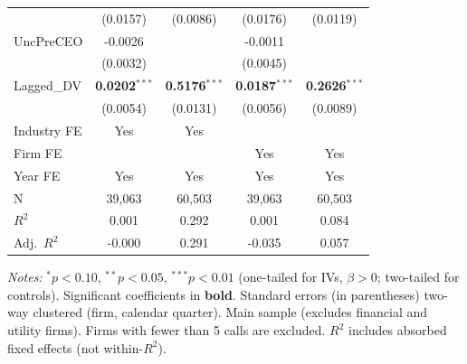\documentclass[11pt,a4paper]{article}
\begin{document}
\begin{table}[htbp]
\begin{tabular}{lcccc}
 & (0.0157) & (0.0086) & (0.0176) & (0.0119) \\
UncPreCEO & -0.0026 &  & -0.0011 &  \\
 & (0.0032) &  & (0.0045) &  \\
Lagged\_DV & \textbf{0.0202}$^{***}$ & \textbf{0.5176}$^{***}$ & \textbf{0.0187}$^{***}$ & \textbf{0.2626}$^{***}$ \\
 & (0.0054) & (0.0131) & (0.0056) & (0.0089) \\
\midrule
Industry FE & Yes & Yes &  &  \\
Firm FE &  &  & Yes & Yes \\
Year FE & Yes & Yes & Yes & Yes \\
\midrule
N & 39,063 & 60,503 & 39,063 & 60,503 \\
$R^2$ & 0.001 & 0.292 & 0.001 & 0.084 \\
Adj.~$R^2$ & -0.000 & 0.291 & -0.035 & 0.057 \\
\bottomrule
\end{tabular}
\begin{minipage}{\linewidth}
\vspace{2pt}\scriptsize
\textit{Notes:} $^{*}p<0.10$, $^{**}p<0.05$, $^{***}p<0.01$ (one-tailed for IVs, $\beta > 0$; two-tailed for controls).
 Significant coefficients in \textbf{bold}.
 Standard errors (in parentheses) two-way clustered (firm, calendar quarter).
 Main sample (excludes financial and utility firms). Firms with fewer than 5 calls are excluded.
 $R^2$ includes absorbed fixed effects (not within-$R^2$).
\end{minipage}
\end{table}
\clearpage
\end{document}
